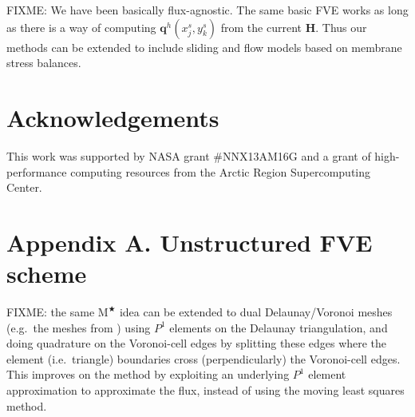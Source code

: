 \documentclass[twocolumn,letterpaper]{igs}
\newcommand\bq{\mathbf{q}}
\newcommand\bH{\mathbf{H}}
\newcommand{\Mstar}{$\text{M}^{\bigstar}$\xspace}
\begin{document}
FIXME: We have been basically flux-agnostic.  The same basic FVE works as long as there is a way of computing $\bq^h(x_j^s,y_k^s)$ from the current $\bH$.  Thus our methods can be extended to include sliding and flow models based on membrane stress balances. 

\section*{Acknowledgements}
This work was supported by NASA grant \#NNX13AM16G and a grant of high-performance computing resources from the Arctic Region Supercomputing Center.





\appendix
\section{Appendix A.  Unstructured FVE scheme}  \label{sec:appA}

FIXME: the same \Mstar idea can be extended to dual Delaunay/Voronoi meshes (e.g.~the meshes from \cite{EgholmNielsen2010,Ringleretal2013}) using $P^1$ elements on the Delaunay triangulation, and doing quadrature on the Voronoi-cell edges by splitting these edges where the element (i.e.~triangle) boundaries cross (perpendicularly) the Voronoi-cell edges.  This improves on the \cite{EgholmNielsen2010} method by exploiting an underlying $P^1$ element approximation to approximate the flux, instead of using the moving least squares method.

\begin{comment}
Here is what the MPAS Land-Ice User's Manual version 3.0 says:
\begin{quote}
\small
Velocities and fluxes are calculated on the midpoint of Voronoi cell edges.  The normal component of surface slope is calculated on cell edges using surface elevation at adjacent cell centers.  The tangential component of surface slope is calculated on cell edges using surface elevation at adjacent vertices. The surface elevation at vertices is calculated from the values at adjacent cell centers using barycentric interpolation. Ice thickness on edges is calculated as the average of the adjacent cell center values (2nd-order approximation).
\end{quote}
Looking at this, and their code, I don't think they think of it as Petrov-Galerkin
\end{comment}
\end{document}
